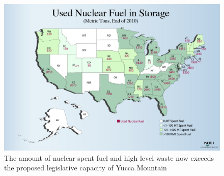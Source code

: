 \begin{figure}[htbp!]
  \begin{center}
    \includegraphics{metric_tons.eps}
  \end{center}
  \caption{The amount of nuclear spent fuel and high level waste now exceeds the 
    proposed legislative capacity of Yucca Mountain \cite{peters_what_2013}}
  \label{fig:metric_tons}
\end{figure}
